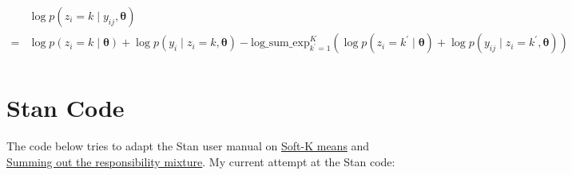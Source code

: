 \documentclass[12pt,letterpaper]{article}
\newcommand{\bth}{\bm{\theta}}
\begin{document}
\begin{align*}
&\log p(z_i = k \mid y_{ij}, \bth)\\
=& \log p(z_i = k \mid \bth) + \log p(y_i \mid z_i = k,  \bth)   - \mathrm{log\_sum\_exp}_{k^\prime = 1}^K\left(\log p(z_i = k^\prime \mid \bth) + \log p(y_{ij} \mid z_i = k^\prime, \bth)\right)\\
\end{align*}

\pagebreak

\section{Stan Code}

The code below tries to adapt the Stan user manual on
\href{https://mc-stan.org/docs/2_20/stan-users-guide/soft-k-means.html}{Soft-K
means} and
\href{https://mc-stan.org/docs/2_20/stan-users-guide/summing-out-the-responsibility-parameter.html}{Summing
out the responsibility mixture}. My current attempt at the Stan code:
\end{document}
